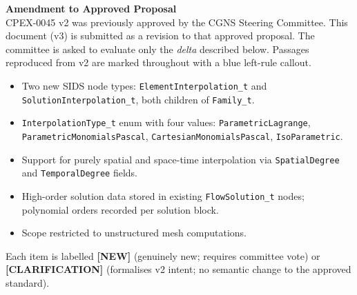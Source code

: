 \documentclass[11pt,letterpaper]{article}
\newcommand{\NEW}{\textcolor{newgreen}{\textbf{[NEW]}}}
\newcommand{\CLARIFY}{\textcolor{clarifybrown}{\textbf{[CLARIFICATION]}}}
\begin{document}
\newpage

{\sloppy

\begin{center}
  {\large\bfseries\color{cgnsblue} Amendment to Approved Proposal}\\[0.3em]
  {\normalsize\color{cgnsteal}
   CPEX-0045 v2 was previously approved by the CGNS Steering Committee.
   This document (v3) is submitted as a revision to that approved proposal.
   The committee is asked to evaluate only the \emph{delta} described below.
   Passages reproduced from v2 are marked throughout with a blue left-rule callout.}
\end{center}

\medskip

\nopagebreak
\begin{itemize}[nosep,leftmargin=1.5em]
  \item Two new SIDS node types: \texttt{ElementInterpolation\_t} and
    \texttt{SolutionInterpolation\_t}, both children of \texttt{Family\_t}.
  \item \texttt{InterpolationType\_t} enum with four values:
    \texttt{ParametricLagrange}, \texttt{ParametricMonomialsPascal},
    \texttt{CartesianMonomialsPascal}, \texttt{IsoParametric}.
  \item Support for purely spatial and space-time interpolation via
    \texttt{SpatialDegree} and \texttt{TemporalDegree} fields.
  \item High-order solution data stored in existing \texttt{FlowSolution\_t}
    nodes; polynomial orders recorded per solution block.
  \item Scope restricted to unstructured mesh computations.
\end{itemize}

\medskip

\nopagebreak

\noindent Each item is labelled \NEW{} (genuinely new; requires committee vote)
or \CLARIFY{} (formalises v2 intent; no semantic change to the approved standard).

}
\end{document}
